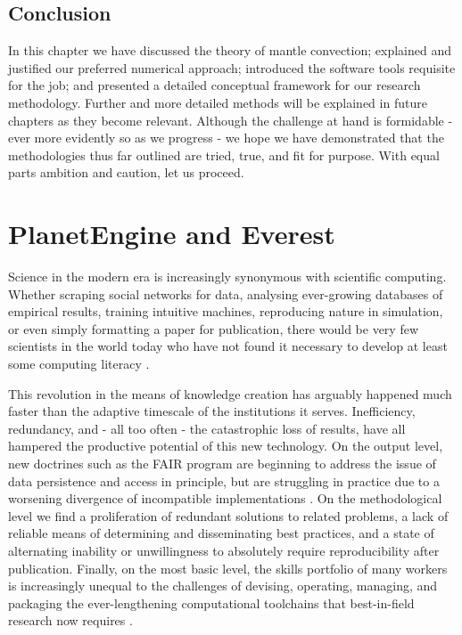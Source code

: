 \documentclass[a4paper,11pt,oneside]{book}
\begin{document}
\subsection{Conclusion}

In this chapter we have discussed the theory of mantle convection; explained and justified our preferred numerical approach; introduced the software tools requisite for the job; and presented a detailed conceptual framework for our research methodology. Further and more detailed methods will be explained in future chapters as they become relevant. Although the challenge at hand is formidable - ever more evidently so as we progress - we hope we have demonstrated that the methodologies thus far outlined are tried, true, and fit for purpose. With equal parts ambition and caution, let us proceed.

\section{PlanetEngine and Everest}

Science in the modern era is increasingly synonymous with scientific computing. Whether scraping social networks for data, analysing ever-growing databases of empirical results, training intuitive machines, reproducing nature in simulation, or even simply formatting a paper for publication, there would be very few scientists in the world today who have not found it necessary to develop at least some computing literacy \cite{Wilson2014-zo}.

This revolution in the means of knowledge creation has arguably happened much faster than the adaptive timescale of the institutions it serves. Inefficiency, redundancy, and - all too often - the catastrophic loss of results, have all hampered the productive potential of this new technology. On the output level, new doctrines such as the FAIR program \cite{Wilkinson2016-qr} are beginning to address the issue of data persistence and access in principle, but are struggling in practice due to a worsening divergence of incompatible implementations \cite{Jacobsen2020-cc}. On the methodological level we find a proliferation of redundant solutions to related problems, a lack of reliable means of determining and disseminating best practices, and a state of alternating inability or unwillingness to absolutely require reproducibility after publication. Finally, on the most basic level, the skills portfolio of many workers is increasingly unequal to the challenges of devising, operating, managing, and packaging the ever-lengthening computational toolchains that best-in-field research now requires \cite{Wilson2017-xm}.
\end{document}
